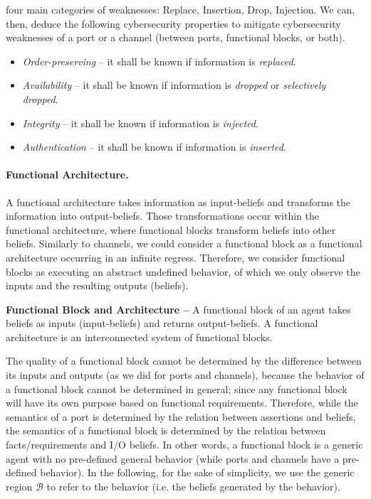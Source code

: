 \documentclass[runningheads]{llncs}
\newcommand{\beliefRegion}{\mathcal{B}}
\begin{document}
four main categories of weaknesses: Replace, Insertion, Drop, Injection. We can,
then, deduce the following cybersecurity properties to mitigate cybersecurity weaknesses
of a port or a channel (between ports, functional blocks, or both).
\begin{itemize}
	\item \emph{Order-preserving} -- it shall be known if information is \emph{replaced}.
	\item \emph{Availability} -- it shall be known if information is \emph{dropped} or \emph{selectively dropped}.
	\item \emph{Integrity} -- it shall be known if information is \emph{injected}.
	\item \emph{Authentication} -- it shall be known if information is \emph{inserted}.
\end{itemize}

\paragraph{Functional Architecture.}
A functional architecture takes information as input-beliefs and transforms the
information into output-beliefs. Those transformations occur within the
functional architecture, where functional blocks transform beliefs into other
beliefs. Similarly to channels, we could consider a functional block as a
functional architecture occurring in an infinite regress. Therefore, we
consider functional blocks as executing an abstract undefined behavior, of
which we only observe the inputs and the resulting outputs (beliefs).

\begin{definition}{\bf Functional Block and Architecture --}\label{def:funblock}
	A functional block of an agent takes beliefs as  inputs (input-beliefs) and
	returns output-beliefs.  A functional architecture is an
	interconnected system of functional blocks.
\end{definition}
The quality of a functional block cannot be determined
by the difference between its inputs and outputs (as we did for
ports and channels), because the behavior of a functional block
cannot be determined in general; since any functional block will have 
its own purpose based on functional requirements. 
Therefore, while the semantics of a port is determined by the relation 
between assertions and beliefs, the semantics of a functional block 
is determined by the relation between facts/requirements and I/O beliefs.
In other words, a functional block is a generic agent with no pre-defined general
behavior (while ports and channels have a pre-defined behavior).
In the following, for the sake of simplicity, 
we use the generic region $\beliefRegion$ to refer to the behavior (i.e.
the beliefs generated by the behavior).
\end{document}

